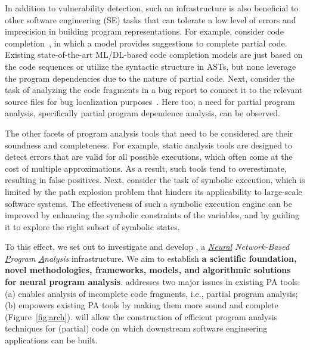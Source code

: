 In addition to vulnerability detection, such an 
infrastructure
is also beneficial to other software engineering (SE) tasks that can tolerate a low level of errors and imprecision in building program representations. For example, consider code completion~\cite{}, in which a model provides suggestions to complete partial code. Existing state-of-the-art ML/DL-based code completion models are just based on the code sequences or utilize the syntactic structure in ASTs, but none leverage the program dependencies due to the nature of partial code. Next, consider the task of analyzing the code fragments in a bug report to connect it to the relevant source files for bug localization purposes~\cite{}. Here too, a need for partial program analysis, specifically partial program dependence analysis, can be observed.

The other facets of program analysis tools that need to be considered are their soundness and completeness. For example, static analysis tools are designed to detect errors that are valid for all possible executions, which often come at the cost of multiple approximations. As a result, such tools tend to overestimate, resulting in false positives. Next, consider the task of symbolic execution, which is limited by the path explosion problem that hinders its applicability to large-scale software systems. The effectiveness of such a symbolic execution engine can be improved by enhancing the symbolic constraints of the variables, and by guiding it to explore the right subset of symbolic states. 

To this effect, we set out to investigate and develop {\tool}, a {\em \underline{Neural} Network-Based \underline{P}rogram \underline{A}nalysis} infrastructure. We aim to establish {\bf a scientific foundation, novel methodologies, frameworks, models, and algorithmic solutions for neural program analysis}. {\tool} addresses two major issues in existing PA tools: (a) enables analysis of incomplete code fragments, i.e., partial program analysis; (b) empowers existing PA tools by making them more sound and complete (Figure~\ref{fig:arch}). {\tool} will allow the construction of efficient program analysis techniques for (partial) code on which downstream software engineering applications can be built.

